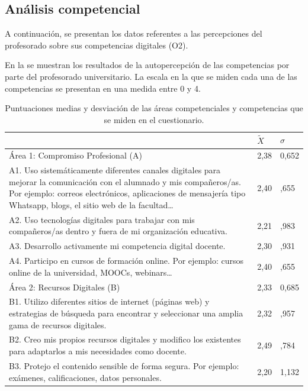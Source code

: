 \documentclass[spanish]{textolivre}
\begin{document}
\subsection{Análisis competencial}
A continuación, se presentan los datos referentes a las percepciones del profesorado sobre sus competencias digitales (O2).

En la  se muestran los resultados de la autopercepción de las competencias por parte del profesorado universitario. La escala en la que se miden cada una de las competencias se presentan en una medida entre 0 y 4. 

\begin{longtable}{p{}p{}p{}}
\caption{Puntuaciones medias y desviación de las áreas competenciales y competencias que se miden en el cuestionario.}
\label{tab6}
\\
\toprule
& $\tilde{X}$ & $\sigma$
\\ 
\midrule
Área 1: Compromiso Profesional (A) & 2,38 & 0,652
\\
A1. Uso sistemáticamente diferentes canales digitales para mejorar la comunicación con el alumnado y mis compañeros/as. Por ejemplo: correos electrónicos, aplicaciones de mensajería tipo Whatsapp, blogs, el sitio web de la facultad… & 2,40 & ,655
\\
A2. Uso tecnologías digitales para trabajar con mis compañeros/as dentro y fuera de mi organización educativa. & 2,21 & ,983
\\
A3. Desarrollo activamente mi competencia digital docente. & 2,30 & ,931
\\
A4. Participo en cursos de formación online. Por ejemplo: cursos online de la universidad, MOOCs, webinars… & 2,40 & ,655
\\
\midrule
Área 2: Recursos Digitales (B) & 2,33 & 0,685
\\
B1. Utilizo diferentes sitios de internet (páginas web) y estrategias de búsqueda para encontrar y seleccionar una amplia gama de recursos digitales. & 2,32 & ,957
\\
B2. Creo mis propios recursos digitales y modifico los existentes para adaptarlos a mis necesidades como docente. & 2,49 & ,784
\\
B3. Protejo el contenido sensible de forma segura. Por ejemplo: exámenes, calificaciones, datos personales. & 2,20 & 1,132

\end{longtable}
\end{document}
